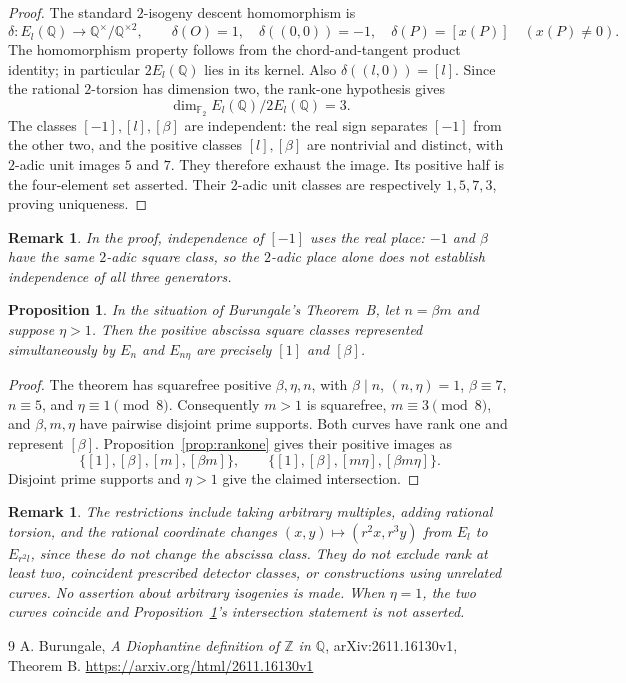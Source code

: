 \documentclass[11pt]{article}
\newtheorem{proposition}[theorem]{Proposition}
\newtheorem{remark}[theorem]{Remark}
\newcommand{\Q}{\mathbb Q}
\begin{document}
\begin{proof}
The standard $2$-isogeny descent homomorphism is
\[
 \delta:E_l(\Q)\longrightarrow\Q^\times/\Q^{\times2},\qquad
 \delta(O)=1,\quad\delta((0,0))=-1,\quad
 \delta(P)=[x(P)]\quad(x(P)\ne0).
\]
The homomorphism property follows from the chord-and-tangent product identity; in particular $2E_l(\Q)$ lies in its kernel. Also $\delta((l,0))=[l]$. Since the rational $2$-torsion has dimension two, the rank-one hypothesis gives
\[
 \dim_{\mathbb F_2} E_l(\Q)/2E_l(\Q)=3.
\]
The classes $[-1],[l],[\beta]$ are independent: the real sign separates $[-1]$ from the other two, and the positive classes $[l],[\beta]$ are nontrivial and distinct, with $2$-adic unit images $5$ and $7$. They therefore exhaust the image. Its positive half is the four-element set asserted. Their $2$-adic unit classes are respectively $1,5,7,3$, proving uniqueness.
\end{proof}

\begin{remark}
In the proof, independence of $[-1]$ uses the real place: $-1$ and $\beta$ have the same $2$-adic square class, so the $2$-adic place alone does not establish independence of all three generators.
\end{remark}

\begin{proposition}\label{prop:pair}
In the situation of Burungale's Theorem~B, let $n=\beta m$ and suppose $\eta>1$. Then the positive abscissa square classes represented simultaneously by $E_n$ and $E_{n\eta}$ are precisely $[1]$ and $[\beta]$.
\end{proposition}
\begin{proof}
The theorem has squarefree positive $\beta,\eta,n$, with $\beta\mid n$, $(n,\eta)=1$, $\beta\equiv7$, $n\equiv5$, and $\eta\equiv1\pmod8$. Consequently $m>1$ is squarefree, $m\equiv3\pmod8$, and $\beta,m,\eta$ have pairwise disjoint prime supports. Both curves have rank one and represent $[\beta]$. Proposition~\ref{prop:rankone} gives their positive images as
\[
 \{[1],[\beta],[m],[\beta m]\},\qquad
 \{[1],[\beta],[m\eta],[\beta m\eta]\}.
\]
Disjoint prime supports and $\eta>1$ give the claimed intersection.
\end{proof}

\begin{remark}
The restrictions include taking arbitrary multiples, adding rational torsion, and the rational coordinate changes
$(x,y)\mapsto(r^2x,r^3y)$ from $E_l$ to $E_{r^2l}$, since these do not change the abscissa class. They do not exclude rank at least two, coincident prescribed detector classes, or constructions using unrelated curves. No assertion about arbitrary isogenies is made. When $\eta=1$, the two curves coincide and Proposition~\ref{prop:pair}'s intersection statement is not asserted.
\end{remark}

\begin{thebibliography}{9}
 A. Burungale, \emph{A Diophantine definition of $\mathbb Z$ in $\mathbb Q$}, arXiv:2611.16130v1, Theorem B. \url{https://arxiv.org/html/2611.16130v1}
\end{thebibliography}
\end{document}
